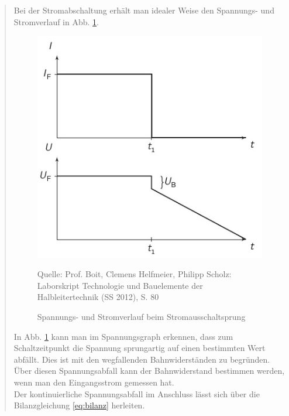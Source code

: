 \begin{quote}
    \vspace{2em}

    Bei der Stromabschaltung erhält man idealer Weise den Spannungs- und
    Stromverlauf in Abb. \ref{fig:Stromausschalten}.

    \vspace{2em}

    \begin{figure}[H]
        \centering
        \includegraphics[scale=0.8]{./SchaltverhaltenBilder/Stromausschalten.jpg}
        \caption{Spannungs- und Stromverlauf beim Stromausschaltsprung}
             \begin{center}
                 \small Quelle: Prof. Boit, Clemens Helfmeier, Philipp Scholz: Laborskript Technologie und Bauelemente der Halbleitertechnik (SS 2012), S. 80
             \end{center}
        \label{fig:Stromausschalten}
    \end{figure}

    \vspace{2em}

    In Abb. \ref{fig:Stromausschalten} kann man im Spannungsgraph erkennen,
    dass zum Schaltzeitpunkt die Spannung sprungartig auf einen bestimmten Wert
    abfällt. Dies ist mit den wegfallenden Bahnwiderständen zu begründen. Über
    diesen Spannungsabfall kann der Bahnwiderstand bestimmen werden, wenn
    man den Eingangsstrom gemessen hat.\\
    Der kontinuierliche Spannungsabfall im Anschluss lässt sich über die
    Bilanzgleichung \ref{eq:bilanz} herleiten.


\end{quote}
